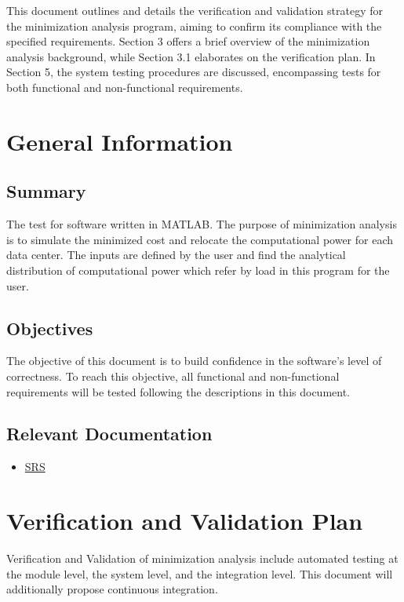 \documentclass[12pt, titlepage]{article}
\begin{document}

This document outlines and details the verification and validation strategy for the minimization analysis program, aiming to confirm its compliance with the specified requirements. Section 3 offers a brief overview of the minimization analysis background, while Section 3.1 elaborates on the verification plan. In Section 5, the system testing procedures are discussed, encompassing tests for both functional and non-functional requirements.
\newpage

\section{General Information}
\label{GeneralInfo}

\subsection{Summary}

The test for software written in MATLAB. The purpose of minimization analysis is to simulate the minimized cost and relocate the computational power for each data center. The inputs are defined by the user and find the analytical distribution of computational power which refer by load in this program for the user.

\subsection{Objectives}

The objective of this document is to build confidence in the software's level of correctness. To reach this objective, all functional and non-functional requirements will be tested following the descriptions in this document.

\subsection{Relevant Documentation}

\begin{itemize}
	\item 
	\href{https://github.com/XingzhiMac/CAS741-Proj/blob/master/docs/SRS/SRS.pdf}
	{SRS} 
\end{itemize}

\section{Verification and Validation Plan}\label{plan}
Verification and Validation of minimization analysis include automated testing at the module level, the system level, and the integration level. This document will additionally propose continuous integration.	
\end{document}
